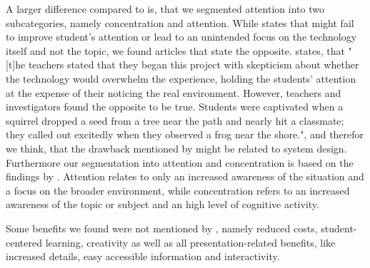 A larger difference compared to \cite{Radu.2014} is, that we segmented attention into two subcategories, namely concentration and attention. While \cite{Radu.2014} states that \AR \apps might fail to improve student's attention or lead to an unintended focus on the technology itself and not the topic\autocite[cf.][314]{Radu.2014}, we found articles that state the opposite. \cite{Kamarainen.2013} states, that "[t]he teachers stated that they began this project with skepticism about whether the technology would overwhelm the experience, holding the students’ attention at the expense of their noticing the real environment. However, teachers and investigators found the opposite to be true. Students were captivated when a squirrel dropped a seed from a tree near the path and nearly hit a classmate; they called out excitedly when they observed a frog near the shore."\autocite[554]{Kamarainen.2013}, and therefor we think, that the drawback mentioned by \cite{Radu.2014} might be related to system design. Furthermore our segmentation into attention and concentration is based on the findings by \cite{Kamarainen.2013}. Attention relates to only an increased awareness of the situation and a focus on the broader environment, while concentration refers to an increased awareness of the topic or subject and an high level of cognitive activity.

%
% 

Some benefits we found were not mentioned by \cite{Radu.2014}, namely reduced costs, student-centered learning, creativity as well as all presentation-related benefits, like increased details, easy accessible information and interactivity.\\

